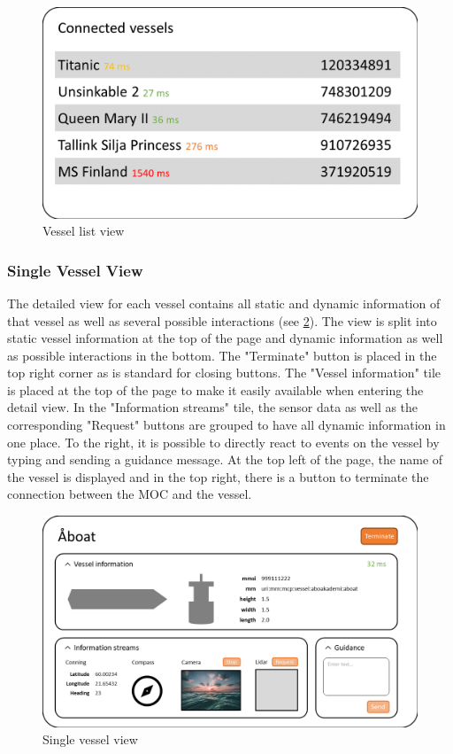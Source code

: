 \begin{figure}[ht]
	\centering
	\includegraphics[width=\linewidth]{images/gui-overview}
	\caption{Vessel list view}
	\label{fig:gui-overview}
\end{figure}

\subsubsection{Single Vessel View}

The detailed view for each vessel contains all static and dynamic information of that vessel as well as several possible interactions (see \ref{fig:gui-vessel}).
The view is split into static vessel information at the top of the page and dynamic information as well as possible interactions in the bottom. The "Terminate" button is placed in the top right corner as is standard for closing buttons.
The "Vessel information" tile is placed at the top of the page to make it easily available when entering the detail view.
In the "Information streams" tile, the sensor data as well as the corresponding "Request" buttons are grouped to have all dynamic information in one place. To the right, it is possible to directly react to events on the vessel by typing and sending a guidance message.
At the top left of the page, the name of the vessel is displayed and in the top right, there is a button to terminate the connection between the MOC and the vessel.

\begin{figure}[ht]
\centering
\includegraphics[width=\linewidth]{images/gui-vessel}
\caption{Single vessel view}
\label{fig:gui-vessel}
\end{figure}
